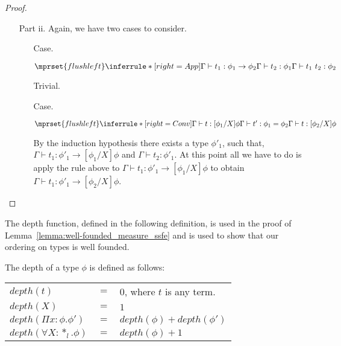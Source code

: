 \begin{proof}
\begin{itemize}
\item[Part ii.]  Again, we have two cases to consider.
  \begin{itemize}
  \item[Case.]\ \\
    \begin{center}
      \begin{math}
        $$\mprset{flushleft}
        \inferrule* [right=App] {
          \Gamma \vdash t_1 : \phi_1 \rightarrow \phi_2 
          \\
          \Gamma \vdash t_2 : \phi_1
        }{\Gamma \vdash t_1\ t_2 : \phi_2}
      \end{math}  
    \end{center}
    Trivial.
    
  \item[Case.]\ \\
    \begin{center}
      \begin{math}
        $$\mprset{flushleft}
        \inferrule* [right=Conv] {
          \Gamma \vdash t:[\phi_1/X]\phi
          \\
          \Gamma \vdash t' : \phi_1 = \phi_2
        }{\Gamma \vdash t: [\phi_2/X]\phi}
      \end{math} 
    \end{center}
    By the induction hypothesis there exists a type 
    $\phi'_1$, such that, $\Gamma \vdash t_1:\phi'_1 \to [\phi_1/X]\phi$ and 
    $\Gamma \vdash t_2:\phi'_1$.  At this point all we have to do is apply the rule above to 
    $\Gamma \vdash t_1:\phi'_1 \to [\phi_1/X]\phi$ to obtain 
    $\Gamma \vdash t_1:\phi'_1 \to [\phi_2/X]\phi$.
  \end{itemize}
\end{itemize}
\end{proof}
The depth function, defined in the following definition, is used in
the proof of Lemma~\ref{lemma:well-founded_measure_ssfe} and is used
to show that our ordering on types is well founded.

\begin{definition}
  The depth of a type $\phi$ is defined as follows:
  \begin{center}
    \begin{tabular}{lll}
      $depth(t)$                  & $=$ & $0$, where $t$ is any term.\\
      $depth(X)$                  & $=$ & $1$\\
      $depth(\Pi x:\phi.\phi')$   & $=$ & $depth(\phi) + depth(\phi')$\\
      $depth(\forall X:*_l.\phi)$ & $=$ & $depth(\phi) + 1$\\
    \end{tabular}
  \end{center}
\end{definition}


